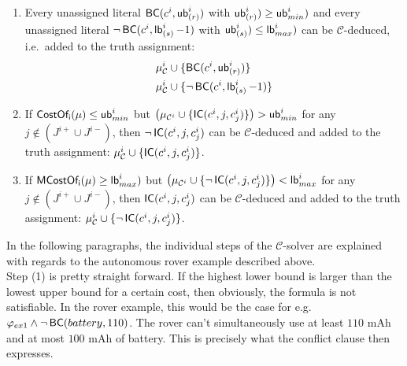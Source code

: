 \documentclass{amsart}
\theoremstyle{definition}
\theoremstyle{remark}
\numberwithin{equation}{section}
\def\C{$\mathcal{C}$}
\begin{document}
    \begin{enumerate}[resume]
      \item Every unassigned literal $\operatorname{\sf BC \rm}(c^i, \operatorname{\sf ub \rm}_{(r)}^i)$ with $\operatorname{\sf ub \rm}_{(r)}^i) \geq \operatorname{\sf ub \rm}_{min}^i)$ and every unassigned literal $\neg \operatorname{\sf BC \rm}(c^i, \operatorname{\sf lb \rm}_{(s)}^i - 1)$ with $\operatorname{\sf ub \rm}_{(s)}^i) \leq \operatorname{\sf lb \rm}_{max}^i)$ can be \C{}-deduced, i.e.\ added to the truth assignment:
      \begin{equation*}
        \begin{split}
          \mu_{\mathcal{C}}^i &\cup \{\operatorname{\sf BC \rm}(c^i, \operatorname{\sf ub \rm}_{(r)}^i)\} \\
          \mu_{\mathcal{C}}^i &\cup \{\neg \operatorname{\sf BC \rm}(c^i, \operatorname{\sf lb \rm}_{(s)}^{i} - 1)\}
        \end{split}
      \end{equation*}
      \item If $\operatorname{\sf CostOf_i \rm}(\mu) \leq \operatorname{\sf ub \rm}_{min}^i$ but $\left(\mu_{\mathcal{C}^i} \cup \{\operatorname{\sf IC \rm}(c^i, j, c^i_j)\}\right) > \operatorname{\sf ub \rm}_{min}^i$ for any $j \not\in (J^{i+} \cup J^{i-})$, then $\neg \operatorname{\sf IC \rm}(c^i, j, c^i_j)$ can be \C{}-deduced and added to the truth assignment: $\mu_{\mathcal{C}}^i \cup \{\operatorname{\sf IC \rm}(c^i, j, c^i_j)\}$.
      \item If $\operatorname{\sf MCostOf_i \rm}(\mu) \geq \operatorname{\sf lb \rm}_{max}^i)$ but $\left(\mu_{\mathcal{C}^i} \cup \{\neg \operatorname{\sf IC \rm}(c^i, j, c^i_j)\}\right) < \operatorname{\sf lb \rm}_{max}^i$ for any $j \not\in (J^{i+} \cup J^{i-})$, then $\operatorname{\sf IC \rm}(c^i, j, c^i_j)$ can be \C{}-deduced and added to the truth assignment: $\mu_{\mathcal{C}}^i \cup \{\neg \operatorname{\sf IC \rm}(c^i, j, c^i_j)\}$.
    \end{enumerate}

    In the following paragraphs, the individual steps of the \C{}-solver are explained with regards to the autonomous rover example described above. \\

    Step (1) is pretty straight forward. If the highest lower bound is larger than the lowest upper bound for a certain cost, then obviously, the formula is not satisfiable. In the rover example, this would be the case for e.g.\ $\varphi_{ex1} \land \neg \operatorname{\sf BC \rm}(battery,110)$. The rover can't simultaneously use at least $110$ mAh and at most $100$ mAh of battery. This is precisely what the conflict clause then expresses. \\
\end{document}
